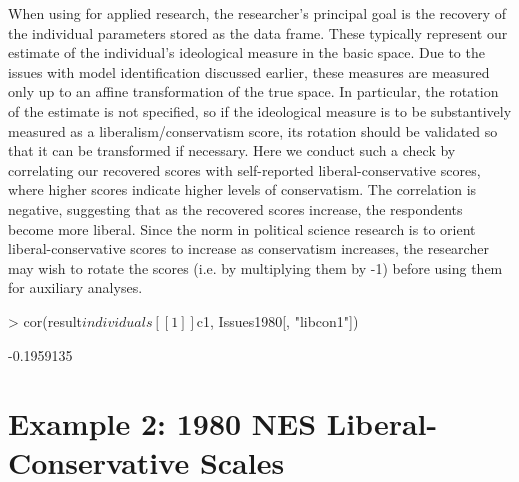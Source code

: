 \documentclass[nojss]{jss}
\begin{document}
When using  for applied research, the researcher's principal goal is the recovery of
the individual parameters stored as the  data frame. These typically represent our
estimate of the individual's ideological measure in the basic space. Due to the issues with model identification
discussed earlier, these measures are measured only up to an affine transformation of the true space.
In particular, the rotation of the estimate is not specified, so if the ideological measure is to be
substantively measured as a liberalism/conservatism score, its rotation should be validated so that it
can be transformed if necessary.  Here we conduct such a check by correlating our recovered scores with
self-reported liberal-conservative scores, where higher scores indicate higher levels of conservatism.
The correlation is negative, suggesting that as the recovered scores increase, the respondents become more liberal.
Since the norm in political science research is to orient liberal-conservative scores to increase as
conservatism increases, the researcher may wish to rotate the scores (i.e. by multiplying them by -1) before
using them for auxiliary analyses. 

\begin{Schunk}
\begin{Sinput}
> cor(result$individuals[[1]]$c1, Issues1980[, "libcon1"])
\end{Sinput}
\begin{Soutput}
[1] -0.1959135
\end{Soutput}
\end{Schunk}

\section{Example 2: 1980 NES Liberal-Conservative Scales}
\end{document}
